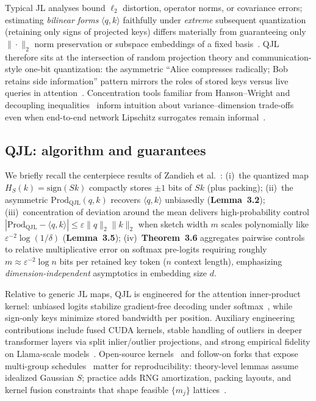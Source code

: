 \documentclass[conference]{IEEEtran}
\begin{document}
Typical JL analyses bound \(\ell_2\) distortion, operator norms, or covariance errors; estimating \emph{bilinear forms} \(\langle q,k\rangle\) faithfully under \emph{extreme} subsequent quantization (retaining only signs of projected keys) differs materially from guaranteeing only \(\|\cdot\|_2\) norm preservation or subspace embeddings of a fixed basis~\cite{zandieh2024qjl}. QJL therefore sits at the intersection of random projection theory and communication-style one-bit quantization: the asymmetric ``Alice compresses radically; Bob retains side information'' pattern mirrors the roles of stored keys versus live queries in attention~\cite{zandieh2024qjl}. Concentration tools familiar from Hanson--Wright and decoupling inequalities~\cite{rudelson2014,woodruff2014} inform intuition about variance--dimension trade-offs even when end-to-end network Lipschitz surrogates remain informal~\cite{lipschitz2024}.

\subsection{QJL: algorithm and guarantees}

We briefly recall the centerpiece results of Zandieh et al.~\cite{zandieh2024qjl}: (i)~the quantized map \(H_S(k)=\mathrm{sign}(Sk)\) compactly stores \(\pm 1\) bits of \(Sk\) (plus packing); (ii)~the asymmetric \(\mathrm{Prod}_{\mathrm{QJL}}(q,k)\) recovers \(\langle q,k\rangle\) unbiasedly (\textbf{Lemma~3.2}); (iii)~concentration of deviation around the mean delivers high-probability control \(|\mathrm{Prod}_{\mathrm{QJL}}-\langle q,k\rangle|\leq \varepsilon\|q\|_2\|k\|_2\) when sketch width \(m\) scales polynomially like \(\varepsilon^{-2}\log(1/\delta)\) (\textbf{Lemma~3.5}); (iv)~\textbf{Theorem~3.6} aggregates pairwise controls to relative multiplicative error on softmax pre-logits requiring roughly \(m\approx \varepsilon^{-2}\log n\) bits per retained key token (\(n\) context length), emphasizing \emph{dimension-independent} asymptotics in embedding size \(d\).

Relative to generic JL maps, QJL is engineered for the attention inner-product kernel: unbiased logits stabilize gradient-free decoding under softmax~\cite{zandieh2024qjl}, while sign-only keys minimize stored bandwidth per position. Auxiliary engineering contributions include fused CUDA kernels, stable handling of outliers in deeper transformer layers via split inlier/outlier projections, and strong empirical fidelity on Llama-scale models~\cite{zandieh2024qjl,qjlkernel}. Open-source kernels~\cite{qjlkernel} and follow-on forks that expose multi-group schedules~\cite{zandieh2024aqjl-repo} matter for reproducibility: theory-level lemmas assume idealized Gaussian \(S\); practice adds RNG amortization, packing layouts, and kernel fusion constraints that shape feasible \(\{m_j\}\) lattices~\cite{presentation_mqjl}.
\end{document}
